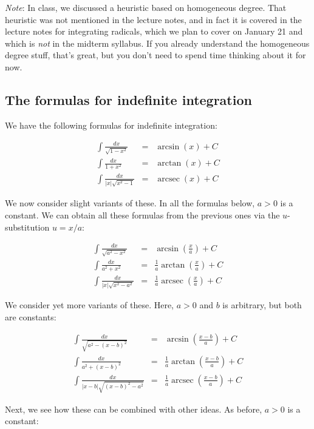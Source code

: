 \documentclass[10pt]{amsart}
\begin{document}
{\em Note}: In class, we discussed a heuristic based on homogeneous
degree. That heuristic was not mentioned in the lecture notes, and in
fact it is covered in the lecture notes for integrating radicals,
which we plan to cover on January 21 and which is {\em not} in the
midterm syllabus. If you already understand the homogeneous degree
stuff, that's great, but you don't need to spend time thinking about
it for now.
\subsection{The formulas for indefinite integration}

We have the following formulas for indefinite integration:

\begin{eqnarray*}
  \int \frac{dx}{\sqrt{1 - x^2}} & = & \arcsin(x) + C \\
  \int \frac{dx}{1 + x^2} & = & \arctan(x) + C\\
  \int \frac{dx}{|x|\sqrt{x^2 - 1}} & = & \operatorname{arcsec}(x) + C
\end{eqnarray*}

We now consider slight variants of these. In all the formulas below,
$a > 0$ is a constant. We can obtain all these formulas from the
previous ones via the $u$-substitution $u = x/a$:

\begin{eqnarray*}
  \int \frac{dx}{\sqrt{a^2 - x^2}} & = & \arcsin\left(\frac{x}{a}\right) + C\\
  \int \frac{dx}{a^2 + x^2} & = & \frac{1}{a} \arctan \left(\frac{x}{a}\right) + C\\
  \int \frac{dx}{|x|\sqrt{x^2 - a^2}} & = & \frac{1}{a} \operatorname{arcsec}\left(\frac{x}{a}\right) +C
\end{eqnarray*}

We consider yet more variants of these. Here, $a > 0$ and $b$ is
arbitrary, but both are constants:

\begin{eqnarray*}
  \int \frac{dx}{\sqrt{a^2 - (x - b)^2}} & = & \arcsin\left(\frac{x - b}{a}\right) + C\\
  \int \frac{dx}{a^2 + (x - b)^2} & = & \frac{1}{a} \arctan \left(\frac{x - b}{a} \right) + C\\
  \int \frac{dx}{|x - b|\sqrt{(x - b)^2 - a^2}} & = & \frac{1}{a} \operatorname{arcsec}\left(\frac{x - b}{a}\right) + C
\end{eqnarray*}

Next, we see how these can be combined with other ideas. As before, $a
> 0$ is a constant:
\end{document}

